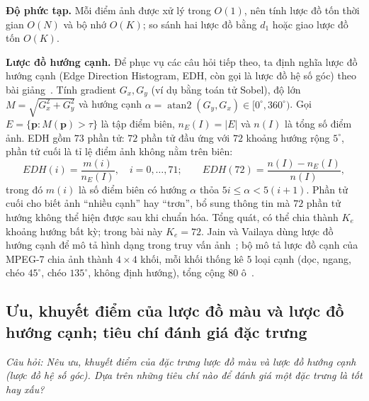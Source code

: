 \textbf{Độ phức tạp.} Mỗi điểm ảnh được xử lý trong $O(1)$, nên tính lược đồ tốn thời gian $O(N)$ và bộ nhớ $O(K)$; so sánh hai lược đồ bằng $d_1$ hoặc giao lược đồ tốn $O(K)$.

\textbf{Lược đồ hướng cạnh.} Để phục vụ các câu hỏi tiếp theo, ta định nghĩa lược đồ hướng cạnh (Edge Direction Histogram, EDH, còn gọi là lược đồ hệ số góc) theo bài giảng~\citep{xlav_lec2}. Tính gradient $G_x, G_y$ (ví dụ bằng toán tử Sobel), độ lớn $M = \sqrt{G_x^2 + G_y^2}$ và hướng cạnh $\alpha = \operatorname{atan2}(G_y, G_x) \in [0^\circ, 360^\circ)$. Gọi $E = \{\mathbf{p} : M(\mathbf{p}) > \tau\}$ là tập điểm biên, $n_E(I) = |E|$ và $n(I)$ là tổng số điểm ảnh. EDH gồm $73$ phần tử: $72$ phần tử đầu ứng với $72$ khoảng hướng rộng $5^\circ$, phần tử cuối là tỉ lệ điểm ảnh không nằm trên biên:
\begin{equation}
EDH(i) = \frac{m(i)}{n_E(I)}, \quad i = 0, \ldots, 71; \qquad EDH(72) = \frac{n(I) - n_E(I)}{n(I)},
\label{eq:w4_eh}
\end{equation}
trong đó $m(i)$ là số điểm biên có hướng $\alpha$ thỏa $5i \le \alpha < 5(i + 1)$. Phần tử cuối cho biết ảnh ``nhiều cạnh'' hay ``trơn'', bổ sung thông tin mà $72$ phần tử hướng không thể hiện được sau khi chuẩn hóa. Tổng quát, có thể chia thành $K_e$ khoảng hướng bất kỳ; trong bài này $K_e = 72$.
Jain và Vailaya dùng lược đồ hướng cạnh để mô tả hình dạng trong truy vấn ảnh~\citep{jain1996image}; bộ mô tả lược đồ cạnh của MPEG-7 chia ảnh thành $4 \times 4$ khối, mỗi khối thống kê $5$ loại cạnh (dọc, ngang, chéo $45^\circ$, chéo $135^\circ$, không định hướng), tổng cộng $80$ ô~\citep{manjunath2001color}.

\subsection{Ưu, khuyết điểm của lược đồ màu và lược đồ hướng cạnh; tiêu chí đánh giá đặc trưng}
\label{subsec:w4_proscons}

\textit{Câu hỏi: Nêu ưu, khuyết điểm của đặc trưng lược đồ màu và lược đồ hướng cạnh (lược đồ hệ số góc). Dựa trên những tiêu chí nào để đánh giá một đặc trưng là tốt hay xấu?}

